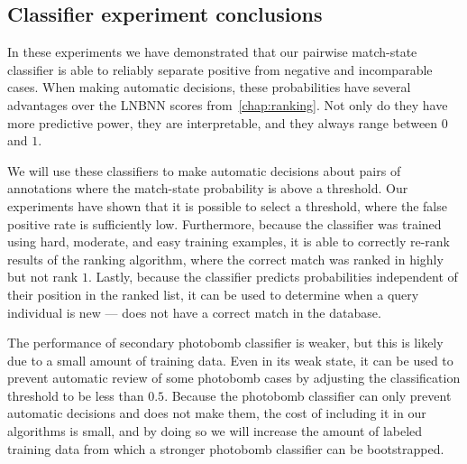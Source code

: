         \PBFailures{}

        \PBLabelErrors{}

    \FloatBarrier{}
    \subsection{Classifier experiment conclusions}
        In these experiments we have demonstrated that our pairwise match-state classifier is able to reliably
          separate positive from negative and incomparable cases.
        When making automatic decisions, these probabilities have several advantages over the LNBNN scores
          from~\cref{chap:ranking}.
        Not only do they have more predictive power, they are interpretable, and they always range between $0$
          and $1$.

        We will use these classifiers to make automatic decisions about pairs of annotations where the
          match-state probability is above a threshold.
        Our experiments have shown that it is possible to select a threshold, where the false positive rate is
          sufficiently low.
        Furthermore, because the classifier was trained using hard, moderate, and easy training examples, it is
          able to correctly re-rank results of the ranking algorithm, where the correct match was ranked in highly
          but not rank $1$.
        Lastly, because the classifier predicts probabilities independent of their position in the ranked list,
          it can be used to determine when a query individual is new --- \ie{} does not have a correct match in the
          database.

        The performance of secondary photobomb classifier is weaker, but this is likely due to a small amount of
          training data.
        Even in its weak state, it can be used to prevent automatic review of some photobomb cases by adjusting
          the classification threshold to be less than $0.5$.
        Because the photobomb classifier can only prevent automatic decisions and does not make them, the cost of
          including it in our algorithms is small, and by doing so we will increase the amount of labeled training
          data from which a stronger photobomb classifier can be bootstrapped.


